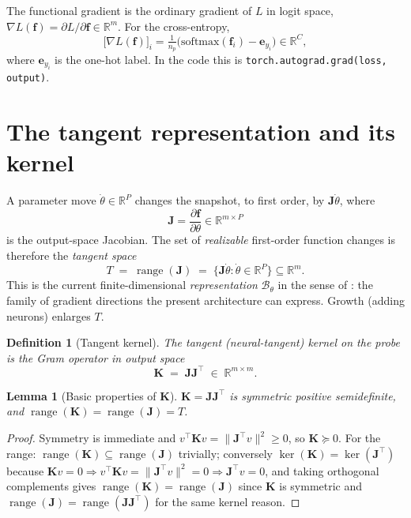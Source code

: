 \documentclass[conference]{IEEEtran}
\newtheorem{lemma}{Lemma}
\newtheorem{definition}{Definition}
\theoremstyle{remark}
\DeclareMathOperator{\range}{range}
\newcommand{\R}{\mathbb{R}}
\newcommand{\norm}[1]{\lVert #1\rVert}
\newcommand{\grad}{\nabla}
\newcommand{\J}{\mathbf{J}}
\newcommand{\K}{\mathbf{K}}
\newcommand{\f}{\bm{f}}
\newcommand{\transpose}{^{\!\top}}
\begin{document}
The functional gradient is the ordinary gradient of $L$ in logit space,
$\grad L(\f)=\partial L/\partial \f\in\R^m$. For the cross-entropy,
\begin{equation}\label{eq:cegrad}
\big[\grad L(\f)\big]_i=\tfrac1{n_p}\big(\mathrm{softmax}(\f_i)-\bm e_{y_i}\big)
\in\R^{C},
\end{equation}
where $\bm e_{y_i}$ is the one-hot label. In the code this is
\texttt{torch.autograd.grad(loss, output)}.

\section{The tangent representation and its kernel}
A parameter move $\dot\theta\in\R^P$ changes the snapshot, to first order, by
$\J\dot\theta$, where
\begin{equation}
\J=\frac{\partial \f}{\partial\theta}\in\R^{m\times P}
\end{equation}
is the output-space Jacobian. The set of \emph{realizable} first-order function
changes is therefore the \emph{tangent space}
\begin{equation}
T \;=\; \range(\J)\;=\;\{\J\dot\theta:\dot\theta\in\R^P\}\subseteq\R^m .
\end{equation}
This is the current finite-dimensional \emph{representation} $\mathcal B_\theta$ in
the sense of \cite{fgd}: the family of gradient directions the present
architecture can express. Growth (adding neurons) enlarges $T$.

\begin{definition}[Tangent kernel]
The tangent (neural-tangent) kernel on the probe is the Gram operator in output
space
\begin{equation}
\K \;=\; \J\J\transpose \;\in\;\R^{m\times m}.
\end{equation}
\end{definition}

\begin{lemma}[Basic properties of $\K$]\label{lem:kernel}
$\K=\J\J\transpose$ is symmetric positive semidefinite, and $\range(\K)=\range(\J)=T$.
\end{lemma}
\begin{proof}
Symmetry is immediate and $v\transpose\K v=\norm{\J\transpose v}^2\ge0$, so
$\K\succeq0$. For the range: $\range(\K)\subseteq\range(\J)$ trivially; conversely
$\ker(\K)=\ker(\J\transpose)$ because $\K v=0\Rightarrow v\transpose\K v
=\norm{\J\transpose v}^2=0\Rightarrow\J\transpose v=0$, and taking orthogonal
complements gives $\range(\K)=\range(\J)$ since $\K$ is symmetric and
$\range(\J)=\range(\J\J\transpose)$ for the same kernel reason.
\end{proof}
\end{document}
